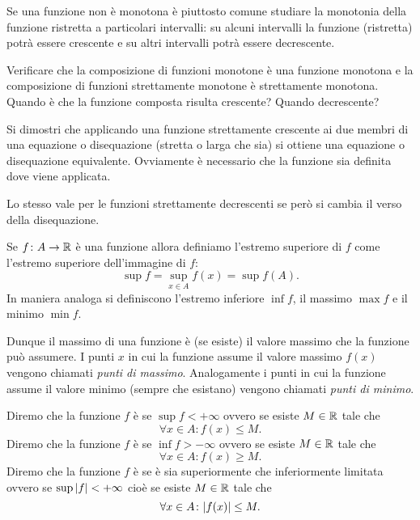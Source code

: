 Se una funzione non è monotona è piuttosto comune studiare 
la monotonia della funzione ristretta a particolari intervalli: 
su alcuni intervalli la funzione (ristretta) potrà essere crescente e su altri 
intervalli potrà essere decrescente.

\begin{exercise}
Verificare che la composizione di funzioni monotone è una
funzione monotona e la composizione di funzioni strettamente
monotone è strettamente monotona.
Quando è che la funzione composta risulta crescente?
Quando decrescente?
\end{exercise}

\begin{exercise}
Si dimostri che applicando una funzione strettamente crescente ai due
membri di una equazione o disequazione (stretta o larga che sia)
si ottiene una equazione o disequazione equivalente.
Ovviamente è necessario che la funzione sia definita dove viene applicata.

Lo stesso vale per le funzioni strettamente decrescenti 
se però si cambia il verso della disequazione.
\end{exercise}

\begin{definition}
\label{def:funzione_limitata}%
Se $f\colon A \to \mathbb R$ è una funzione allora definiamo
l'estremo superiore di $f$ come l'estremo superiore
dell'immagine di $f$:
\[
  \sup f = \sup_{x\in A} f(x) = \sup f(A).
\]
In maniera analoga si definiscono l'estremo inferiore $\inf f$,
il massimo $\max f$ e il minimo $\min f$.

Dunque il massimo di una funzione è (se esiste) il valore massimo
che la funzione può assumere. I punti $x$ in cui
la funzione assume il valore massimo $f(x)$ vengono chiamati
\emph{punti di massimo}.
%
%
%
Analogamente i punti in cui la funzione
assume il valore minimo (sempre che esistano) vengono
chiamati \emph{punti di minimo}.

Diremo che la funzione $f$ è
se $\sup f<+\infty$
ovvero se esiste $M\in \mathbb R$ tale che
\[
\forall x\in A \colon f(x) \le M.
\]
Diremo che la funzione $f$ è
se $\inf f > -\infty$ ovvero se esiste $M\in \mathbb R$ tale che
\[
 \forall x \in A \colon f(x) \ge M.
\]
Diremo che la funzione $f$ è 
se è sia superiormente che inferiormente limitata ovvero
se $\sup{\left|f\right|}<+\infty$ cioè se esiste $M\in \mathbb R$ tale che
\[
\forall x \in A \colon {\left|f(x)\right|}\le M.
\]
\end{definition}

